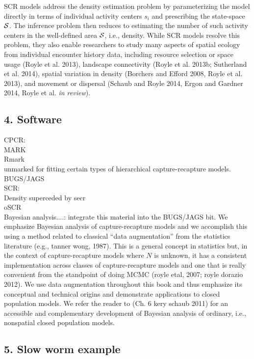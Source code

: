 \documentclass{book}
\begin{document}
SCR models address the density estimation problem by parameterizing
the model directly in terms of individual activity centers $s_i$ and
prescribing the state-space ${\cal S}$. The inference problem then
reduces to estimating the number of such activity centers in the
well-defined area ${\cal S}$, i.e., density. While SCR models resolve
this problem, they also enable researchers to study many aspects of
spatial ecology from individual encounter history data, including
resource selection or space usage (Royle et al. 2013), landscape
connectivity (Royle et al. 2013b; Sutherland et al. 2014), spatial
variation in density (Borchers and Efford 2008, Royle et al. 2013),
and movement or dispersal (Schaub and Royle 2014, Ergon and Gardner
2014, Royle et al. {\it in review}). 

\subsection*{4. Software}

CPCR:\\
  MARK\\
  Rmark\\
  unmarked for fitting certain types of hierarchical capture-recapture models.\\
  BUGS/JAGS\\
SCR:\\
  Density superceded by secr\\
  oSCR\\

Bayesian analysis....: integrate this material into the BUGS/JAGS
bit. 
We emphasize Bayesian analysis of capture-recapture models and we
accomplish this using a method related to classical ``data
augmentation'' from the statistics literature (e.g., tanner wong, 1987).  This is a general concept in
statistics but, in the context of capture-recapture models where $N$
is unknown, it has a consistent implementation across classes of
capture-recapture models and one that is really convenient from the
standpoint of doing MCMC
(royle etal, 2007; royle dorazio 2012). We use data augmentation
throughout this book and thus emphasize its conceptual and technical
origins and demonstrate applications to closed population models.  We
refer the reader to (Ch. 6 kery schaub 2011) for an
accessible and complementary development of Bayesian analysis of
ordinary, i.e., nonspatial closed population models.



\subsection*{5. Slow worm example}
\end{document}
